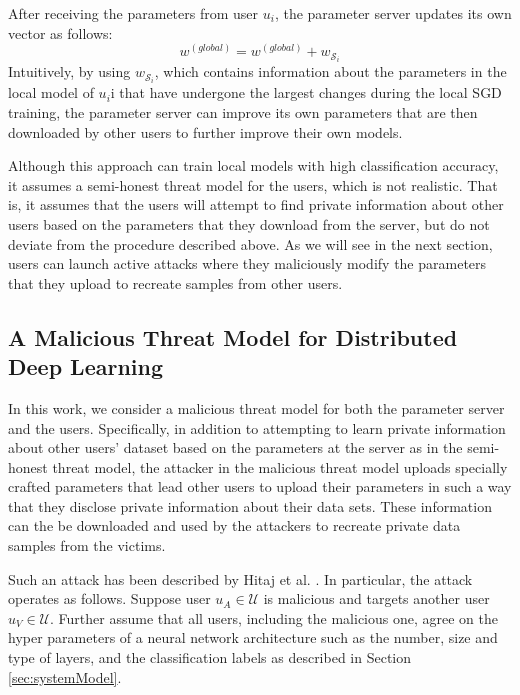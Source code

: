 \documentclass[conference]{IEEEtran}
\begin{document}
After receiving the parameters from user $u_i$, the parameter server updates its own vector as follows:
$$w^{(global)} =  w^{(global)} +  w_{\mathcal{S}_i}$$
Intuitively, by using $w_{\mathcal{S}_i}$, which contains information about the parameters in the local model of $u_i$i that have
undergone the largest changes during the local SGD training, the parameter server can improve its own parameters that are then
downloaded by other users to further improve their own models.  

Although this approach can train local models with high classification accuracy,  it assumes a semi-honest threat model for the users,
which is not realistic. That is, it assumes that the users will attempt to find private information about other users based on 
the parameters that they download from the server, but do not deviate from the procedure described above. As we will see in the next
section, users can launch active attacks where they maliciously modify the parameters that they upload to recreate samples from other
users. 

\subsection{A Malicious Threat Model for Distributed Deep Learning}\label{sec:threatModel}

In this work, we consider a malicious threat model for both the parameter server and the users. Specifically, in addition to
attempting to learn private information about other users' dataset based on the parameters at the server as in the semi-honest threat
model, the attacker in the malicious threat model uploads
specially crafted parameters that lead other users to upload their parameters in
such a way that they disclose private information about their data sets. These information can the be downloaded and used by the
attackers to recreate private data samples from the victims. 

Such an attack has been described by Hitaj et al. \cite{hitaj2017deep}. In particular, the attack operates as follows. 
Suppose user $u_A\in\mathcal{U}$ is malicious and targets another user $u_V\in\mathcal{U}$. Further assume that all users, including
the malicious one, agree on the hyper parameters of a neural network architecture such as the number, size and type of layers,  and the
classification labels as described in Section \ref{sec:systemModel}.
\end{document}
